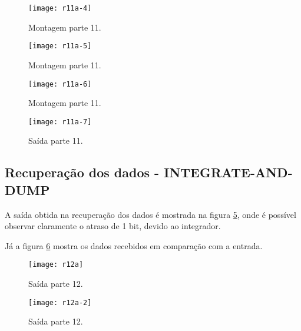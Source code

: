      \begin{figure}[H]
         \centering
         \caption{Montagem parte 11.}
         \texttt{[image: r11a-4]}
         
         \label{fig:r11a-4}
        \end{figure} 
     \begin{figure}[H]
         \centering
         \caption{Montagem parte 11.}
         \texttt{[image: r11a-5]}
         
         \label{fig:r11a-5}
        \end{figure} 

\begin{figure}[H]        
         \centering        
         \caption{Montagem parte 11.}       
         \texttt{[image: r11a-6]}    
         
         \label{fig:r11a-6}
        \end{figure}
\begin{figure}[H]        
    \centering        
    \caption{Saída parte 11.}       
    \texttt{[image: r11a-7]}    
    
    \label{fig:r11a-7}
\end{figure}

\subsection{Recuperação dos dados - INTEGRATE-AND-DUMP}
    A saída obtida na recuperação dos dados é mostrada na figura \ref{fig:r12a}, onde é possível observar claramente o atraso de 1 bit, devido ao integrador.
    
    Já a figura \ref{fig:r12a-2} mostra os dados recebidos em comparação com a entrada.
    
\begin{figure}[H]        
    \centering        
    \caption{Saída parte 12.}       
    \texttt{[image: r12a]}    
    
    \label{fig:r12a}
\end{figure}    


\begin{figure}[H]        
    \centering        
    \caption{Saída parte 12.}       
    \texttt{[image: r12a-2]}    
    
    \label{fig:r12a-2}
\end{figure}    
    
